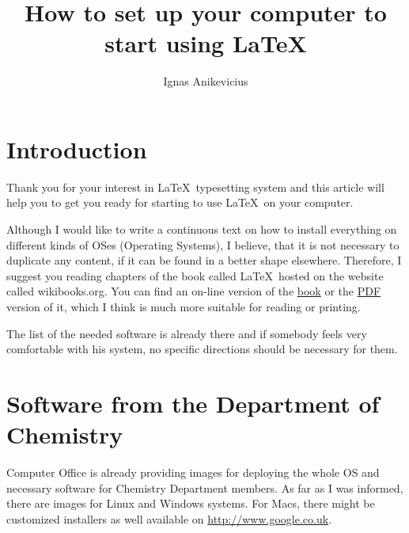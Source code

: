 

\lstset{language=bash,numbers=none}
\newcommand{\MiKTeX}{MiK\TeX}
\newcommand{\MacTeX}{Mac\TeX}

\title{How to set up your computer to start using \LaTeX{}}
\author{Ignas Anikevicius}



\maketitle

\section{Introduction}

Thank you for your interest in \LaTeX\ typesetting system and this article
will help you to get you ready for starting to use \LaTeX\ on your
computer.

Although I would like to write a continuous text on how to install
everything on different kinds of OSes (Operating Systems), I believe, that it
is not necessary to duplicate any content, if it can be found in a better
shape elsewhere. Therefore, I suggest you reading chapters of the book called
\LaTeX\ hosted on the website called wikibooks.org. You can find an on-line
version of the
\href{https://secure.wikimedia.org/wikibooks/en/wiki/LaTeX}{book} or the
\href{http://upload.wikimedia.org/wikipedia/commons/2/2d/LaTeX.pdf}{PDF}
version of it, which I think is much more suitable for reading or printing.

The list of the needed software is already there and if somebody feels very
comfortable with his system, no specific directions should be necessary for
them.

\section{Software from the Department of Chemistry}

Computer Office is already providing images for deploying the whole OS and
necessary software for Chemistry Department members. As far as I was informed,
there are images for Linux and Windows systems. For Macs, there might be
customized installers as well available on \url{http://www.google.co.uk}.

